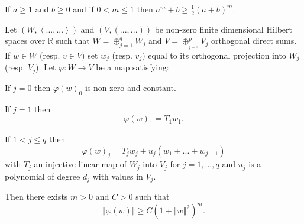 \documentclass[10pt,a4paper]{amsart}
\begin{document}
\begin{lemma}
\label{trivial}If $a\geq1$ and $b\geq0$ and if $0<m\leq1$ then $a^{m}%
+b\geq\frac{1}{2}(a+b)^{m}$.
\end{lemma}

\begin{lemma}
\label{MyInequality}Let $\left(  W,\left\langle ...,...\right\rangle \right)
$ and $(V,(...,...))$ be non-zero finite dimensional Hilbert spaces over
$\mathbb{R}$ such that $W=\oplus_{j=1}^{q}W_{j}$ and $V=\oplus_{_{j=0}}%
^{p}V_{j}$ orthogonal direct sums. If $w\in W$ (resp. $v\in V)$ set $w_{j}$
(resp. $v_{j}$) equal to its orthogonal projection into $W_{j}$ (resp. $V_{j}%
$). Let $\varphi:W\rightarrow V$ be a map satisfying:

If $j=0$ then $\varphi(w)_{0}$ is non-zero and constant.

If $j=1$ then%
\[
\varphi(w)_{1}=T_{1}w_{1}\text{.}
\]


If $1<j\leq q$ then%
\[
\varphi(w)_{j}=T_{j}w_{j}+u_{j}(w_{1}+...+w_{j-1})
\]
with $T_{j}$ an injective linear map of $W_{j}$ into $V_{j}$ for $j=1,...,q$
and $u_{j}$ is a polynomial of degree $d_{j}$ with values in $V_{j}.$

Then there exists $m>0$ and $C>0$ such that
\[
\left\Vert \varphi(w)\right\Vert \geq C(1+\left\Vert w\right\Vert ^{2})^{m}.
\]

\end{lemma}
\end{document}
